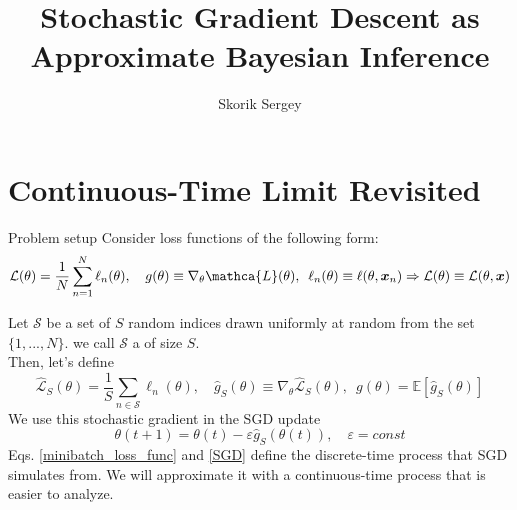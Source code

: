 \documentclass{beamer}
\title{Stochastic Gradient Descent as Approximate Bayesian Inference}
\author{Skorik Sergey}
\institute{MIPT, 2022}
\begin{document}
\begin{frame}
    \titlepage
\end{frame}


\begin{frame}
    \tableofcontents
\end{frame}


\section{Continuous-Time Limit Revisited}

\begin{frame}{Problem setup}
    Consider loss functions of the following form:
    \begin{equation}\label{loss_func}
        \mathcal{L}(\theta) = \dfrac{1}{N}\sum_{n=1}^N \ell_n(\theta), \quad g(\theta) \equiv \nabla_{\theta}\mathca{L}(\theta),\,\,\, \ell_n(\theta) \equiv \ell(\theta, \boldsymbol{x}_n) \Rightarrow \mathcal{L}(\theta) \equiv \mathcal{L}(\theta, \boldsymbol{x})
    \end{equation}

    Let $\mathcal{S}$ be a set of $S$ random indices drawn uniformly at random from the set $\{1, . . . , N\}$. we call $\mathcal{S}$ a  of size $S$. \\
    Then, let's define
    \begin{equation}\label{minibatch_loss_func}
        \hat{\mathcal{L}}_S(\theta) = \dfrac{1}{S}\sum_{n\in \mathcal{S}} \ell_n(\theta), \quad \hat{g}_S(\theta) \equiv \nabla_{\theta}\hat{\mathcal{L}}_S(\theta),\,\,\, g(\theta) = \mathbb{E}[\hat{g}_S(\theta)]
    \end{equation}
    We use this stochastic gradient in the SGD update
    \begin{equation}\label{SGD}
        \theta(t + 1) = \theta(t) - \varepsilon\hat{g}_S(\theta(t)), \quad \varepsilon = const
    \end{equation}
    Eqs. \ref{minibatch_loss_func} and \ref{SGD} define the discrete-time process that SGD simulates from. We will approximate it with a continuous-time process that is easier to analyze.
\end{frame}
\end{document}

